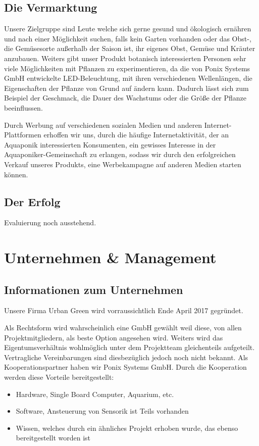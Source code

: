 \documentclass[11pt]{article}
\begin{document}
\subsection{Die Vermarktung}
Unsere Zielgruppe sind Leute welche sich gerne gesund und ökologisch ernähren und nach einer Möglichkeit suchen, falls kein Garten vorhanden oder  das Obst-, die Gemüsesorte außerhalb der Saison ist, ihr eigenes Obst, Gemüse und Kräuter anzubauen. Weiters gibt unser Produkt botanisch interessierten Personen sehr viele Möglichkeiten mit Pflanzen zu experimentieren, da die von Ponix Systems GmbH entwickelte LED-Beleuchtung, mit ihren verschiedenen Wellenlängen, die Eigenschaften der Pflanze von Grund auf ändern kann. Dadurch lässt sich zum Beispiel der Geschmack, die Dauer des Wachstums oder die Größe der Pflanze beeinflussen.

Durch Werbung auf verschiedenen sozialen Medien und anderen Internet-Plattformen erhoffen wir uns, durch die häufige Internetaktivität, der an Aquaponik interessierten Konsumenten, ein gewisses Interesse in der Aquaponiker-Gemeinschaft zu erlangen, sodass wir durch den erfolgreichen Verkauf unseres Produkts, eine Werbekampagne auf anderen Medien starten können.
\subsection{Der Erfolg}
Evaluierung noch ausstehend.
\clearpage
\section{Unternehmen \& Management}
\subsection{Informationen zum Unternehmen}
Unsere Firma Urban Green wird vorraussichtlich Ende April 2017 gegründet.

Als Rechtsform wird wahrscheinlich eine GmbH gewählt weil diese, von allen Projektmitgliedern, als beste Option angesehen wird. Weiters wird das Eigentumsverhältnis wohlmöglich unter dem Projektteam gleichenteils aufgeteilt. Vertragliche Vereinbarungen sind diesbezüglich jedoch noch nicht bekannt.
Als Kooperationspartner haben wir Ponix Systems GmbH.
Durch die Kooperation werden diese Vorteile bereitgestellt:
\begin{itemize}
    \item Hardware, Single Board Computer, Aquarium, etc.
    \item Software, Ansteuerung von Sensorik ist Teils vorhanden
    \item Wissen, welches durch ein ähnliches Projekt erhoben wurde, das ebenso bereitgestellt worden ist
\end{itemize}
\end{document}
